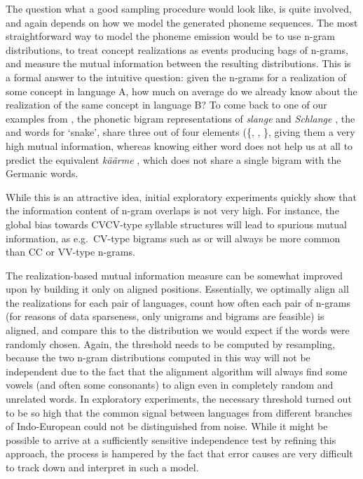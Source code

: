 The question what a good sampling procedure would look like, is quite involved, and again depends on how we model the generated phoneme sequences. The most straightforward way to model the phoneme emission would be to use n-gram distributions, to treat concept realizations as events producing bags of n-grams, and measure the mutual information between the resulting distributions. This is a formal answer to the intuitive question: given the n-grams for a realization of some concept in language A, how much on average do we already know about the realization of the same concept in language B? To come back to one of our examples from , the phonetic bigram representations of \textit{slange} \ipa{[slAN@]} and \textit{Schlange} \ipa{[SlAN@]}, the  and  words for `snake', share three out of four elements (\{\ipa{[lA]}, \ipa{[AN]}, \ipa{[N@]}\}, giving them a very high mutual information, whereas knowing either word does not help us at all to predict the  equivalent \textit{käärme} \ipa{[k\ae\ae rmE]}, which does not share a single bigram with the Germanic words.

While this is an attractive idea, initial exploratory experiments quickly show that the information content of n-gram overlaps is not very high. For instance, the global bias towards CVCV-type syllable structures will lead to spurious mutual information, as e.g.\ CV-type bigrams such as \ipa{[pa]} or \ipa{[ku]} will always be more common than CC or VV-type n-grams.

The realization-based mutual information measure can be somewhat improved upon by building it only on aligned positions. Essentially, we optimally align all the realizations for each pair of languages, count how often each pair of n-grams (for reasons of data sparseness, only unigrams and bigrams are feasible) is aligned, and compare this to the distribution we would expect if the words were randomly chosen. Again, the threshold needs to be computed by resampling, because the two n-gram distributions computed in this way will not be independent due to the fact that the alignment algorithm will always find some vowels (and often some consonants) to align even in completely random and unrelated words. In exploratory experiments, the necessary threshold turned out to be so high that the common signal between languages from different branches of Indo-European could not be distinguished from noise. While it might be possible to arrive at a sufficiently sensitive independence test by refining this approach, the process is hampered by the fact that error causes are very difficult to track down and interpret in such a model.

